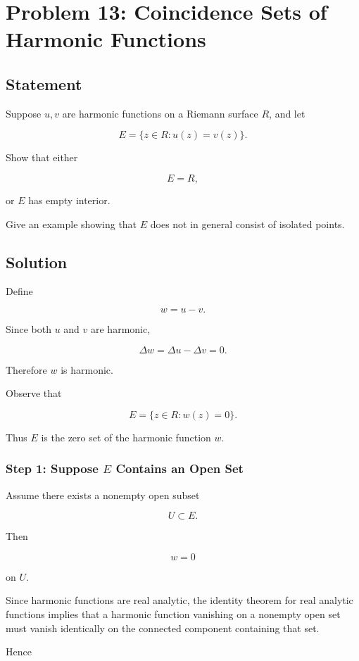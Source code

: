 \documentclass[12pt,a4paper]{article}
\theoremstyle{notespace}
\begin{document}
\section{Problem 13: Coincidence Sets of Harmonic Functions}

\subsection*{Statement}

Suppose \(u,v\) are harmonic functions on a Riemann surface \(R\), and let

\[
E
=
\{z\in R : u(z)=v(z)\}.
\]

Show that either

\[
E=R,
\]

or \(E\) has empty interior.

Give an example showing that \(E\) does not in general consist of isolated points.

\subsection*{Solution}

Define

\[
w=u-v.
\]

Since both \(u\) and \(v\) are harmonic,

\[
\Delta w
=
\Delta u-\Delta v
=
0.
\]

Therefore \(w\) is harmonic.

Observe that

\[
E
=
\{z\in R:w(z)=0\}.
\]

Thus \(E\) is the zero set of the harmonic function \(w\).

\subsubsection*{Step 1: Suppose \(E\) Contains an Open Set}

Assume there exists a nonempty open subset

\[
U\subset E.
\]

Then

\[
w=0
\]

on \(U\).

Since harmonic functions are real analytic, the identity theorem for real analytic functions implies that a harmonic function vanishing on a nonempty open set must vanish identically on the connected component containing that set.

Hence
\end{document}
